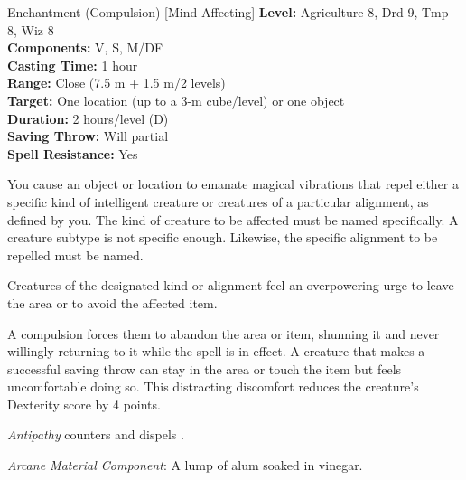 {Enchantment (Compulsion) [Mind-Affecting]}
{
	\textbf{Level:}
	Agriculture 8, Drd 9, Tmp 8, Wiz 8\\
	\textbf{Components:}
	V, S, M/DF\\
	\textbf{Casting Time:}
	1 hour\\
	\textbf{Range:}
	Close (7.5 m + 1.5 m/2 levels)\\
	\textbf{Target:}
	One location (up to a 3-m cube/level) or one object\\
	\textbf{Duration:}
	2 hours/level (D)\\
	\textbf{Saving Throw:}
	Will partial\\
	\textbf{Spell Resistance:}
	Yes\\
}
{
	You cause an object or location to emanate magical vibrations that repel either a specific kind of intelligent creature or creatures of a particular alignment, as defined by you. The kind of creature to be affected must be named specifically. A creature subtype is not specific enough. Likewise, the specific alignment to be repelled must be named.

	Creatures of the designated kind or alignment feel an overpowering urge to leave the area or to avoid the affected item.

	A compulsion forces them to abandon the area or item, shunning it and never willingly returning to it while the spell is in effect. A creature that makes a successful saving throw can stay in the area or touch the item but feels uncomfortable doing so. This distracting discomfort reduces the creature's Dexterity score by 4 points.

	\emph{Antipathy} counters and dispels .

	\textit{Arcane Material Component}:
	A lump of alum soaked in vinegar.

}
